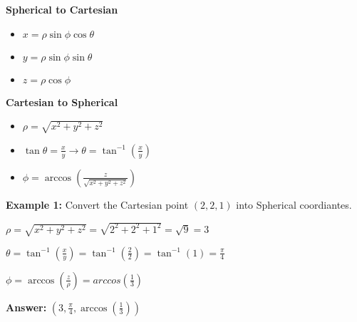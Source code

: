 \documentclass[10pt]{article}                               %
\begin{document}
\begin{adjustwidth}{2em}{0pt}
\begin{adjustwidth}{2em}{0pt}
        \vspace{0.5em}

        \textbf{Spherical to Cartesian}

            \begin{itemize}
                \item \( x = \rho\sin\phi\cos\theta \)
                \item \( y = \rho\sin\phi\sin\theta \)
                \item \( z = \rho\cos\phi \)
            \end{itemize}

            \vspace{0.5em}

            \textbf{Cartesian to Spherical}

            \begin{itemize}
                \item \( \rho = \sqrt{x^2 + y^2 + z^2} \)
                \item \( \tan\theta = \frac{x}{y}  \rightarrow  \theta = \tan^{-1}\left(\frac{x}{y}\right) \)
                \item \( \phi = \arccos\left(\frac{z}{\sqrt{x^2 + y^2 + z^2}}\right) \)
            \end{itemize}

            \begin{examplebox}
        
                \textbf{Example 1:} Convert the Cartesian point \( \left(2,2,1\right) \) into Spherical coordiantes.
                \vspace{0.5em}

                \begin{adjustwidth}{2em}{0pt}

                    \( \rho = \sqrt{x^2 + y^2 + z^2} = \sqrt{2^2 + 2^2 + 1^2} = \sqrt{9} = 3 \)

                    \( \theta = \tan^{-1}\left(\frac{x}{y}\right) = \tan^{-1}\left(\frac{2}{2}\right) = \tan^{-1}(1) = \frac{\pi}{4} \)

                    \( \phi = \arccos\left(\frac{z}{\rho}\right) = arccos\left(\frac{1}{3}\right) \)

                    \textbf{Answer:} \( \left(3, \frac{\pi}{4}, \arccos\left(\frac{1}{3}\right)\right) \)

                \end{adjustwidth}

                \vspace{1em}


\end{examplebox}
\end{adjustwidth}
\end{adjustwidth}
\end{document}
